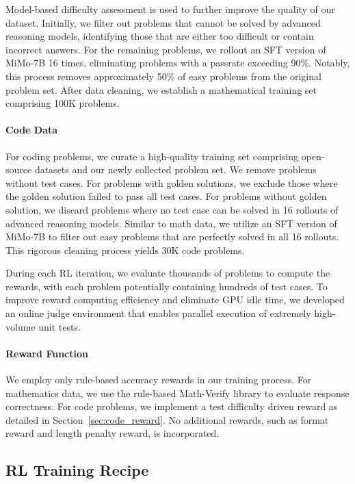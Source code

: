 \documentclass[11pt, a4paper, logo, copyright, nonumbering]{xiaomi}
\newcommand{\mimo}{MiMo-7B}
\newcommand{\codereward}{test difficulty driven reward}
\begin{document}
Model-based difficulty assessment is used to further improve the quality of our dataset.
Initially, we filter out problems that cannot be solved by advanced reasoning models, identifying those that are either too difficult or contain incorrect answers.
For the remaining problems, we rollout an SFT version of \mimo{} 16 times, eliminating problems with a passrate exceeding 90\%.
Notably, this process removes approximately 50\% of easy problems from the original problem set.
After data cleaning, we establish a mathematical training set comprising 100K problems.


\paragraph{Code Data}
For coding problems, we curate a high-quality training set comprising open-source datasets and our newly collected problem set.
We remove problems without test cases.
For problems with golden solutions, we exclude those where the golden solution failed to pass all test cases.
For problems without golden solution, we discard problems where no test case can be solved in 16 rollouts of advanced reasoning models.
Similar to math data, we utilize an SFT version of \mimo{} to filter out easy problems that are perfectly solved in all 16 rollouts.
This rigorous cleaning process yields 30K code problems.


During each RL iteration, we evaluate thousands of problems to compute the rewards, with each problem potentially containing hundreds of test cases. 
To improve reward computing efficiency and eliminate GPU idle time, we developed an online judge environment that enables parallel execution of extremely high-volume unit tests.


\paragraph{Reward Function}
We employ only rule-based accuracy rewards in our training process.
For mathematics data, we use the rule-based Math-Verify library to evaluate response correctness.
For code problems, we implement a \codereward{} as detailed in Section~\ref{sec:code_reward}.
No additional rewards, such as format reward and length penalty reward, is incorporated.

\subsection{RL Training Recipe}
\end{document}
